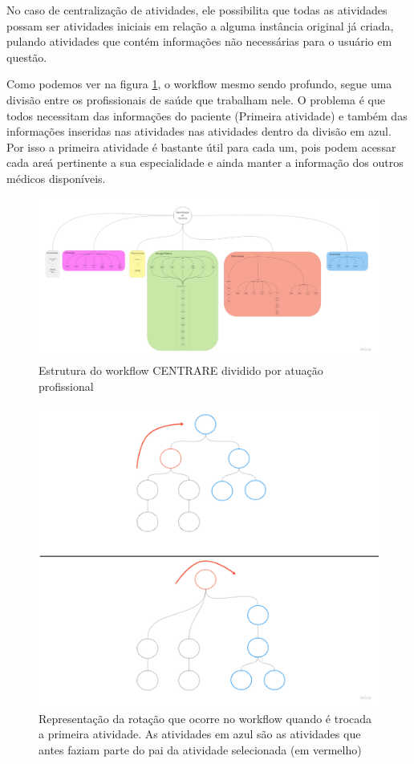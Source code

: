 No caso de centralização de atividades, ele possibilita que todas as atividades possam ser atividades iniciais em relação a alguma instância original já criada, pulando atividades que contém informações não necessárias para o usuário em questão.

Como podemos ver na figura \ref{fig:centrare_divided}, o workflow mesmo sendo profundo, segue uma divisão entre os profissionais de saúde que trabalham nele. O problema é que todos necessitam das informações do paciente (Primeira atividade) e também das informações inseridas nas atividades nas atividades dentro da divisão em azul. Por isso a primeira atividade é bastante útil para cada um, pois podem acessar cada areá pertinente a sua especialidade e ainda manter a informação dos outros médicos disponíveis.

\begin{figure}
    \centering
    \includegraphics[width=1\textwidth]{imgs/CENTRARE/centrare.png}
    \caption{Estrutura do workflow CENTRARE dividido por atuação profissional}
    \label{fig:centrare_divided}
\end{figure}

\begin{figure}
    \centering
    \includegraphics[width=1\textwidth]{imgs/Implementacoes/primeiraImplementacao.png}
    \caption{Representação da rotação que ocorre no workflow quando é trocada a primeira atividade. As atividades em azul são as atividades que antes faziam parte do pai da atividade selecionada (em vermelho)}
    \label{fig:primeira_implementacao}
\end{figure}

